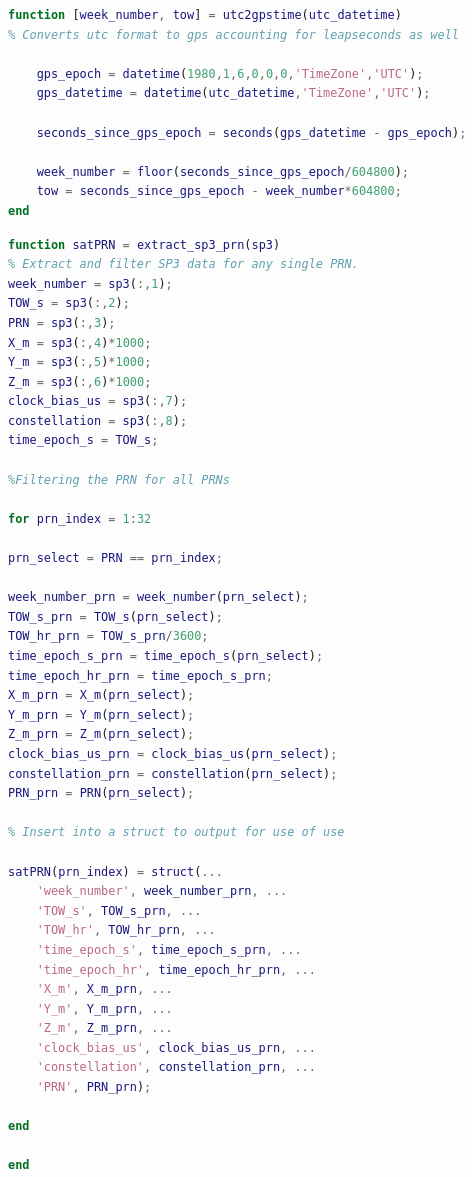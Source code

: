 \documentclass[11pt]{article}
\begin{document}
\newpage

\begin{lstlisting}[language=Matlab]
function [week_number, tow] = utc2gpstime(utc_datetime)
% Converts utc format to gps accounting for leapseconds as well

    gps_epoch = datetime(1980,1,6,0,0,0,'TimeZone','UTC');
    gps_datetime = datetime(utc_datetime,'TimeZone','UTC');

    seconds_since_gps_epoch = seconds(gps_datetime - gps_epoch);

    week_number = floor(seconds_since_gps_epoch/604800);
    tow = seconds_since_gps_epoch - week_number*604800;
end
\end{lstlisting}

\newpage

\begin{lstlisting}[language=Matlab]
function satPRN = extract_sp3_prn(sp3)
% Extract and filter SP3 data for any single PRN.
week_number = sp3(:,1);
TOW_s = sp3(:,2);
PRN = sp3(:,3);
X_m = sp3(:,4)*1000;
Y_m = sp3(:,5)*1000;
Z_m = sp3(:,6)*1000;
clock_bias_us = sp3(:,7);
constellation = sp3(:,8);
time_epoch_s = TOW_s;

%Filtering the PRN for all PRNs

for prn_index = 1:32

prn_select = PRN == prn_index;

week_number_prn = week_number(prn_select);
TOW_s_prn = TOW_s(prn_select);
TOW_hr_prn = TOW_s_prn/3600;
time_epoch_s_prn = time_epoch_s(prn_select);
time_epoch_hr_prn = time_epoch_s_prn;
X_m_prn = X_m(prn_select);
Y_m_prn = Y_m(prn_select);
Z_m_prn = Z_m(prn_select);
clock_bias_us_prn = clock_bias_us(prn_select);
constellation_prn = constellation(prn_select);
PRN_prn = PRN(prn_select);

% Insert into a struct to output for use of use

satPRN(prn_index) = struct(...
    'week_number', week_number_prn, ...
    'TOW_s', TOW_s_prn, ...
    'TOW_hr', TOW_hr_prn, ...
    'time_epoch_s', time_epoch_s_prn, ...
    'time_epoch_hr', time_epoch_hr_prn, ...
    'X_m', X_m_prn, ...
    'Y_m', Y_m_prn, ...
    'Z_m', Z_m_prn, ...
    'clock_bias_us', clock_bias_us_prn, ...
    'constellation', constellation_prn, ...
    'PRN', PRN_prn);

end

end
\end{lstlisting}
\end{document}
